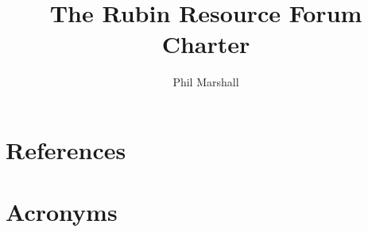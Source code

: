 \documentclass[OPS,authoryear,toc]{lsstdoc}
\title{The Rubin Resource Forum Charter}
\author{%
Phil Marshall
}
\date{\vcsDate}
\begin{document}
\maketitle


\appendix
\section{References} \label{sec:bib}
\renewcommand{\refname}{} %


\section{Acronyms} \label{sec:acronyms}

\end{document}
